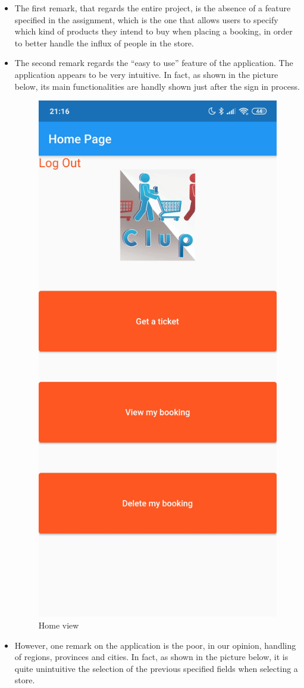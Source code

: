 \documentclass[a4paper,oneside,11pt]{book}
\begin{document}
    \begin{itemize}
        \item The first remark, that regards the entire project, is the absence of a feature specified in the assignment, which is the one that allows users to specify which kind of products they intend to buy when placing a booking, in order to better handle the influx of people in the store.
        \item The second remark regards the “easy to use” feature of the application. The application appears to be very intuitive. In fact, as shown in the picture below, its main functionalities are handly shown just after the sign in process.
        \begin{figure}[H]
            \centering
            \includegraphics[width=.4\textwidth, height=\textheight, keepaspectratio]{pictures/screenshots/home_view.jpg}
            \caption{Home view}
            \label{figure:home_view}
        \end{figure}
        \item However, one remark on the application is the poor, in our opinion, handling of regions, provinces and cities. In fact, as shown in the picture below, it is quite unintuitive the selection of the previous specified fields when selecting a store. \par
        \begin{figure}[H]
            \centering

\end{figure}
\end{itemize}
\end{document}
